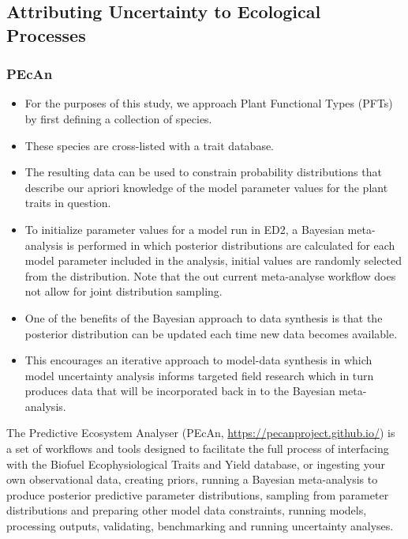 \subsection*{Attributing Uncertainty to Ecological Processes}

{}
\subsubsection*{PEcAn}

\begin{itemize}
    \item For the purposes of this study, we approach Plant Functional Types (PFTs) by first defining a collection of species. 
    \item These species are cross-listed with a trait database. 
    \item The resulting data can be used to constrain probability distributions that describe our apriori knowledge of the model parameter values for the plant traits in question.
    \item To initialize parameter values for a model run in ED2, a Bayesian meta-analysis is performed in which posterior distributions are calculated for each model parameter  included in the analysis, initial values are randomly selected from the distribution. Note that the out current meta-analyse workflow does not allow for joint distribution sampling. 
    \item One of the benefits of the Bayesian approach to data synthesis is that the posterior distribution can be updated each time new data becomes available. 
    \item This encourages an iterative approach to model-data synthesis in which model uncertainty analysis informs targeted field research which in turn produces data that will be incorporated back in to the Bayesian meta-analysis. 
\end{itemize}
 
The Predictive Ecosystem Analyser (PEcAn, \hyperlink{pecanproject.org}{https://pecanproject.github.io/})
is a set of workflows and tools designed to facilitate the full process of interfacing with the Biofuel Ecophysiological Traits and Yield database, or ingesting your own observational data, creating priors, running a Bayesian meta-analysis to produce posterior predictive parameter distributions, sampling from parameter distributions and preparing other model data constraints, running models, processing outputs, validating, benchmarking and running uncertainty analyses. 

